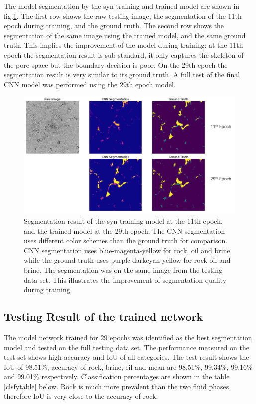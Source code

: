 \documentclass[draft,linenumbers]{agujournal2018}
\begin{document}
 The model segmentation by the syn-training and trained model are shown in fig.\ref{1129}. The first row shows the raw testing image, the segmentation of the 11th epoch during training, and the ground truth. The second row shows the segmentation of the same image using the trained model, and the same ground truth. This implies the improvement of the model during training: at the 11th epoch the segmentation result is sub-standard, it only captures the skeleton of the pore space but the boundary decision is poor. On the 29th epoch the segmentation result is very similar to its ground truth. A full test of the final CNN model was performed using the 29th epoch model.
 
 \begin{figure}[h]
 \centering
 \includegraphics[width=33pc]{imgs/11-29.png}
 \caption{Segmentation result of the syn-training model at the 11th epoch, and the trained model at the 29th epoch. The CNN segmentation uses different color schemes than the ground truth for comparison. CNN segmentation uses blue-magenta-yellow for rock, oil and brine while the ground truth uses purple-darkcyan-yellow for rock oil and brine. The segmentation was on the same image from the testing data set. This illustrates the improvement of segmentation quality during training.}
 \label{1129}
 \end{figure}
 
\subsection{Testing Result of the trained network}
The model network trained for 29 epochs was identified as the best segmentation model and tested on the full testing data set. The performance measured on the test set shows high accuracy and IoU of all categories. The test result shows the IoU of 98.51\%, accuracy of rock, brine, oil and mean are 98.51\%, 99.34\%, 99.16\% and 99.01\% respectively. Classification percentages are shown in the table \ref{clsfytable} below. Rock is much more prevalent than the two fluid phases, therefore IoU is very close to the accuracy of rock.
\end{document}
